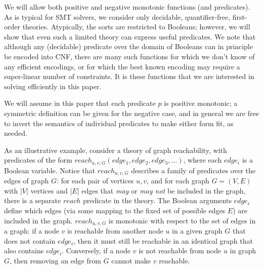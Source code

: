 \documentclass[runningheads]{llncs}
\newcommand{\comments}[1]{}
\begin{document}
We will allow both positive and negative monotonic functions (and predicates). As is typical for SMT solvers, we consider only decidable,
quantifier-free, first-order theories. Atypically, the sorts are restricted to Booleans; however, we will show that even such a limited theory can express useful predicates. We note that although any (decidable) predicate over the domain of Booleans can in principle be encoded into CNF, there are many such functions for which we don't know of any efficient encodings, or for which the best known encoding may require a super-linear number of constraints. It is these functions that we are interested in solving efficiently in this paper.

\comments{
Finally, because the truth value of each predicate is defined as a function over the atoms of predicates in $S$, and $S \cap P = \emptyset$, we also have that for any $P$-atoms $p$ and $q$, and for any complete truth assignment $M_S$ to the $S$-atoms:
\begin{eqnarray}
\label{condition:independence_under} SAT_T(M_S \cup  \{p\}) \land SAT_T(M_S \cup  \{q\})  & \rightarrow  & SAT_T(M_S \cup  \{p, q\})\\
\label{condition:independence_over} SAT_T(M_S \cup  \{ \lnot p\}) \land SAT_T(M_S \cup  \{ \lnot q\})  & \rightarrow  & SAT_T(M_S \cup  \{ \lnot p, \lnot q\})
\end{eqnarray}
}


We will assume in this paper that each predicate $p$ is positive monotonic; a symmetric definition can be given for the negative case, and in general we are free to invert the semantics of individual predicates to make either form fit, as needed. 

As an illustrative example, consider a theory of graph reachability,
with predicates of the form $reach_{u,v,G}(edge_1, edge_2, edge_3,\ldots)$, where each $edge_i$ is a Boolean variable.
Notice that $reach_{u,v,G}$ describes a family of predicates over the edges of graph $G$: 
for each pair of vertices $u,v$, and for each graph $G=(V,E)$ with $|V|$ vertices
and $|E|$ edges that \textit{may} or \textit{may not} be included in the graph, there is a separate
$reach$ predicate in the theory. The Boolean arguments $edge_i$ 
define which edges (via some mapping to the fixed set of possible edges $E$) are included in the graph.
$reach_{u,v,G}$ is monotonic with respect to the set of edges in a graph:
if a node $v$ is reachable from another node $u$ in a given graph $G$ that does not contain
$edge_i$, then it must still be reachable in an identical graph that also contains $edge_i$.
Conversely, if a node $v$ is not reachable from node $u$ in graph $G$, then removing an edge from $G$ 
cannot make $v$ reachable.
\end{document}
